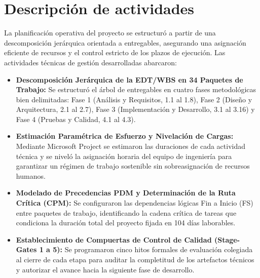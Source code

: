 \documentclass[12pt,a4paper]{article}
\begin{document}
\section{Descripción de actividades}
La planificación operativa del proyecto se estructuró a partir de una descomposición jerárquica orientada a entregables, asegurando una asignación eficiente de recursos y el control estricto de los plazos de ejecución. Las actividades técnicas de gestión desarrolladas abarcaron:

\begin{itemize}[leftmargin=1.5em, itemsep=4pt]
    \item \textbf{Descomposición Jerárquica de la EDT/WBS en 34 Paquetes de Trabajo:} Se estructuró el árbol de entregables en cuatro fases metodológicas bien delimitadas: Fase 1 (Análisis y Requisitos, 1.1 al 1.8), Fase 2 (Diseño y Arquitectura, 2.1 al 2.7), Fase 3 (Implementación y Desarrollo, 3.1 al 3.16) y Fase 4 (Pruebas y Calidad, 4.1 al 4.3).
    \item \textbf{Estimación Paramétrica de Esfuerzo y Nivelación de Cargas:} Mediante Microsoft Project se estimaron las duraciones de cada actividad técnica y se niveló la asignación horaria del equipo de ingeniería para garantizar un régimen de trabajo sostenible sin sobreasignación de recursos humanos.
    \item \textbf{Modelado de Precedencias PDM y Determinación de la Ruta Crítica (CPM):} Se configuraron las dependencias lógicas Fin a Inicio (FS) entre paquetes de trabajo, identificando la cadena crítica de tareas que condiciona la duración total del proyecto fijada en 104 días laborables.
    \item \textbf{Establecimiento de Compuertas de Control de Calidad (Stage-Gates 1 a 5):} Se programaron cinco hitos formales de evaluación colegiada al cierre de cada etapa para auditar la completitud de los artefactos técnicos y autorizar el avance hacia la siguiente fase de desarrollo.
\end{itemize}
\end{document}
